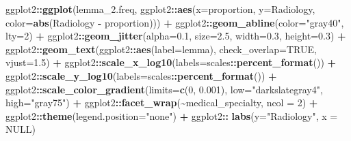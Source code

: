 \documentclass[
]{article}
\newenvironment{Shaded}{\begin{snugshade}}{\end{snugshade}}
\newcommand{\AttributeTok}[1]{\textcolor[rgb]{0.13,0.29,0.53}{#1}}
\newcommand{\ConstantTok}[1]{\textcolor[rgb]{0.56,0.35,0.01}{#1}}
\newcommand{\DecValTok}[1]{\textcolor[rgb]{0.00,0.00,0.81}{#1}}
\newcommand{\FloatTok}[1]{\textcolor[rgb]{0.00,0.00,0.81}{#1}}
\newcommand{\FunctionTok}[1]{\textcolor[rgb]{0.13,0.29,0.53}{\textbf{#1}}}
\newcommand{\NormalTok}[1]{#1}
\newcommand{\SpecialCharTok}[1]{\textcolor[rgb]{0.81,0.36,0.00}{\textbf{#1}}}
\newcommand{\StringTok}[1]{\textcolor[rgb]{0.31,0.60,0.02}{#1}}
\begin{document}
\begin{Shaded}
\begin{Highlighting}[]
\NormalTok{ggplot2}\SpecialCharTok{::}\FunctionTok{ggplot}\NormalTok{(lemma\_2.freq, ggplot2}\SpecialCharTok{::}\FunctionTok{aes}\NormalTok{(}\AttributeTok{x=}\NormalTok{proportion, }
                                         \AttributeTok{y=}\StringTok{\textasciigrave{}}\AttributeTok{Radiology}\StringTok{\textasciigrave{}}\NormalTok{,}
                                         \AttributeTok{color=}\FunctionTok{abs}\NormalTok{(}\StringTok{\textasciigrave{}}\AttributeTok{Radiology}\StringTok{\textasciigrave{}} \SpecialCharTok{{-}}\NormalTok{ proportion))) }\SpecialCharTok{+} 
\NormalTok{  ggplot2}\SpecialCharTok{::}\FunctionTok{geom\_abline}\NormalTok{(}\AttributeTok{color=}\StringTok{"gray40"}\NormalTok{, }\AttributeTok{lty=}\DecValTok{2}\NormalTok{) }\SpecialCharTok{+}
\NormalTok{  ggplot2}\SpecialCharTok{::}\FunctionTok{geom\_jitter}\NormalTok{(}\AttributeTok{alpha=}\FloatTok{0.1}\NormalTok{, }\AttributeTok{size=}\FloatTok{2.5}\NormalTok{, }\AttributeTok{width=}\FloatTok{0.3}\NormalTok{, }\AttributeTok{height=}\FloatTok{0.3}\NormalTok{) }\SpecialCharTok{+}
\NormalTok{  ggplot2}\SpecialCharTok{::}\FunctionTok{geom\_text}\NormalTok{(ggplot2}\SpecialCharTok{::}\FunctionTok{aes}\NormalTok{(}\AttributeTok{label=}\NormalTok{lemma), }\AttributeTok{check\_overlap=}\ConstantTok{TRUE}\NormalTok{, }\AttributeTok{vjust=}\FloatTok{1.5}\NormalTok{) }\SpecialCharTok{+}
\NormalTok{  ggplot2}\SpecialCharTok{::}\FunctionTok{scale\_x\_log10}\NormalTok{(}\AttributeTok{labels=}\NormalTok{scales}\SpecialCharTok{::}\FunctionTok{percent\_format}\NormalTok{()) }\SpecialCharTok{+} 
\NormalTok{  ggplot2}\SpecialCharTok{::}\FunctionTok{scale\_y\_log10}\NormalTok{(}\AttributeTok{labels=}\NormalTok{scales}\SpecialCharTok{::}\FunctionTok{percent\_format}\NormalTok{()) }\SpecialCharTok{+} 
\NormalTok{  ggplot2}\SpecialCharTok{::}\FunctionTok{scale\_color\_gradient}\NormalTok{(}\AttributeTok{limits=}\FunctionTok{c}\NormalTok{(}\DecValTok{0}\NormalTok{, }\FloatTok{0.001}\NormalTok{), }\AttributeTok{low=}\StringTok{"darkslategray4"}\NormalTok{, }\AttributeTok{high=}\StringTok{"gray75"}\NormalTok{) }\SpecialCharTok{+}
\NormalTok{  ggplot2}\SpecialCharTok{::}\FunctionTok{facet\_wrap}\NormalTok{(}\SpecialCharTok{\textasciitilde{}}\NormalTok{medical\_specialty, }\AttributeTok{ncol =} \DecValTok{2}\NormalTok{) }\SpecialCharTok{+}
\NormalTok{  ggplot2}\SpecialCharTok{::}\FunctionTok{theme}\NormalTok{(}\AttributeTok{legend.position=}\StringTok{"none"}\NormalTok{) }\SpecialCharTok{+}
\NormalTok{  ggplot2}\SpecialCharTok{::} \FunctionTok{labs}\NormalTok{(}\AttributeTok{y=}\StringTok{"Radiology"}\NormalTok{, }\AttributeTok{x =} \ConstantTok{NULL}\NormalTok{)}
\end{Highlighting}
\end{Shaded}
\end{document}

